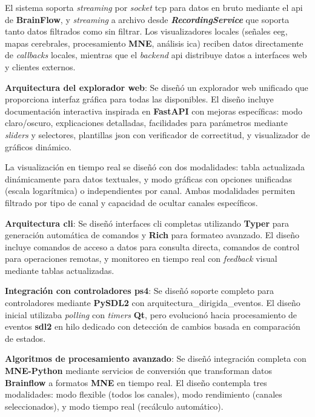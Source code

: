 El sistema soporta \textit{\gls{streaming}} por \textit{socket} \gls{tcp} para datos en bruto mediante el \acrshort{api} de \textbf{BrainFlow}, y \textit{\gls{streaming}} a archivo desde \textit{\textbf{RecordingService}} que soporta tanto datos filtrados como sin filtrar. Los visualizadores locales (señales \acrshort{eeg}, mapas cerebrales, procesamiento \textbf{MNE}, análisis \acrshort{ica}) reciben datos directamente de \textit{\glspl{callback}} locales, mientras que el \textit{backend} \acrshort{api} distribuye datos a interfaces web y clientes externos.

\textbf{Arquitectura del explorador web}:
Se diseñó un explorador web unificado que proporciona interfaz gráfica para todas las  disponibles. El diseño incluye documentación interactiva inspirada en \textbf{FastAPI} con mejoras específicas: modo claro/oscuro, explicaciones detalladas, facilidades para parámetros mediante \textit{sliders} y selectores, plantillas \acrshort{json} con verificador de correctitud, y visualizador de gráficos dinámico.

La visualización en tiempo real se diseñó con dos modalidades: tabla actualizada dinámicamente para datos textuales, y modo gráficas con opciones unificadas (escala logarítmica) o independientes por canal. Ambas modalidades permiten filtrado por tipo de canal y capacidad de ocultar canales específicos.

\textbf{Arquitectura \acrshort{cli}}:
Se diseñó interfaces \acrshort{cli} completas utilizando \textbf{Typer} para generación automática de comandos y \textbf{Rich} para formateo avanzado. El diseño incluye comandos de acceso a datos para consulta directa, comandos de control para operaciones remotas, y monitoreo en tiempo real con \textit{feedback} visual mediante tablas actualizadas.

\textbf{Integración con controladores \acrshort{ps4}}:
Se diseñó soporte completo para controladores mediante \textbf{PySDL2} con \gls{arquitectura_dirigida_eventos}. El diseño inicial utilizaba \textit{\gls{polling}} con \textit{\gls{timers}} \textbf{Qt}, pero evolucionó hacia procesamiento de eventos \textbf{\acrshort{sdl}2} en hilo dedicado con detección de cambios basada en comparación de estados.

\textbf{Algoritmos de procesamiento avanzado}:
Se diseñó integración completa con \textbf{MNE-Python} mediante servicios de conversión que transforman datos \textbf{Brainflow} a formatos \textbf{MNE} en tiempo real. El diseño contempla tres modalidades: modo flexible (todos los canales), modo rendimiento (canales seleccionados), y modo tiempo real (recálculo automático).

